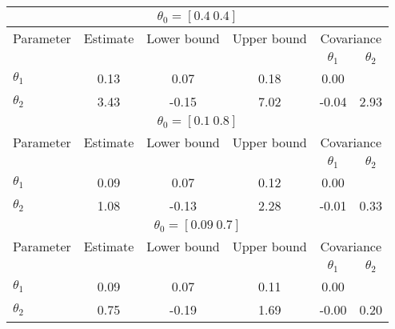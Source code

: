 \begin{tabular}{l|ccc|cc} \hline \hline 
\multicolumn{6}{c}{$\theta_0 = [0.4\ 0.4]$} \\ \hline \hline
Parameter & Estimate & Lower bound & Upper bound & \multicolumn{2}{c}{Covariance}  \\& & & & $\theta_1$ & $\theta_2$ \\ \hline 
$\theta_1$ & 0.13 & 0.07 & 0.18 & 0.00 & \\ 
$\theta_2$ & 3.43 & -0.15 & 7.02 & -0.04 & 2.93 \\ 
\hline \hline 
\multicolumn{6}{c}{$\theta_0 = [0.1\ 0.8]$} \\ \hline \hline
Parameter & Estimate & Lower bound & Upper bound & \multicolumn{2}{c}{Covariance}  \\& & & & $\theta_1$ & $\theta_2$ \\ \hline 
$\theta_1$ & 0.09 & 0.07 & 0.12 & 0.00 & \\ 
$\theta_2$ & 1.08 & -0.13 & 2.28 & -0.01 & 0.33 \\ 
\hline \hline 
\multicolumn{6}{c}{$\theta_0 = [0.09\ 0.7]$} \\ \hline \hline
Parameter & Estimate & Lower bound & Upper bound & \multicolumn{2}{c}{Covariance}  \\& & & & $\theta_1$ & $\theta_2$ \\ \hline 
$\theta_1$ & 0.09 & 0.07 & 0.11 & 0.00 & \\ 
$\theta_2$ & 0.75 & -0.19 & 1.69 & -0.00 & 0.20 \\ 
\hline \hline 
\end{tabular} 
